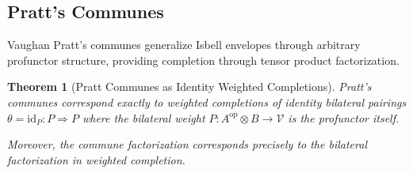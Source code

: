 \documentclass[11pt]{article}
\theoremstyle{plain}
\newtheorem{theorem}{Theorem}[section]
\theoremstyle{definition}
\theoremstyle{remark}
\newcommand{\V}{\mathcal{V}}
\newcommand{\op}{\mathrm{op}}
\begin{document}
\subsection{Pratt's Communes}

Vaughan Pratt's communes \cite{pratt2010communes} generalize Isbell envelopes through arbitrary profunctor structure, providing completion through tensor product factorization.

\begin{theorem}[Pratt Communes as Identity Weighted Completions]\label{thm:pratt-correspondence}
Pratt's communes correspond exactly to weighted completions of identity bilateral pairings $\theta = \text{id}_P : P \Rightarrow P$ where the bilateral weight $P : A^{\op} \otimes B \to \V$ is the profunctor itself.

Moreover, the commune factorization corresponds precisely to the bilateral factorization in weighted completion.
\end{theorem}
\end{document}
